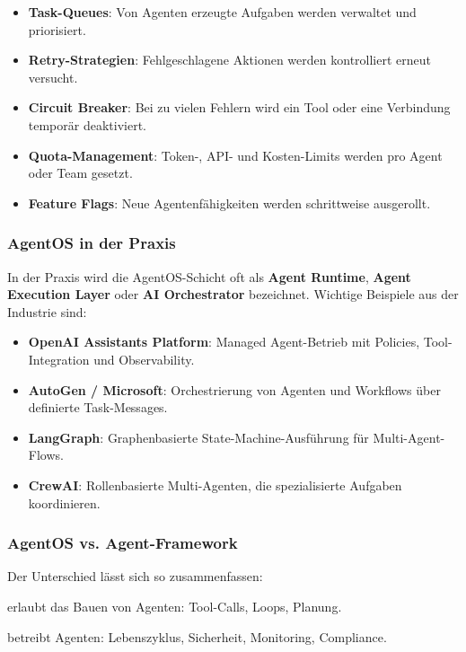 \begin{itemize}[leftmargin=*]
    \item \textbf{Task-Queues}: Von Agenten erzeugte Aufgaben werden verwaltet und priorisiert.
    \item \textbf{Retry-Strategien}: Fehlgeschlagene Aktionen werden kontrolliert erneut versucht.
    \item \textbf{Circuit Breaker}: Bei zu vielen Fehlern wird ein Tool oder eine Verbindung temporär deaktiviert.
    \item \textbf{Quota-Management}: Token-, API- und Kosten-Limits werden pro Agent oder Team gesetzt.
    \item \textbf{Feature Flags}: Neue Agentenfähigkeiten werden schrittweise ausgerollt.
\end{itemize}

\subsubsection{AgentOS in der Praxis}

In der Praxis wird die AgentOS-Schicht oft als \textbf{Agent Runtime}, \textbf{Agent Execution Layer} oder \textbf{AI Orchestrator} bezeichnet. Wichtige Beispiele aus der Industrie sind:

\begin{itemize}[leftmargin=*]
    \item \textbf{OpenAI Assistants Platform}: Managed Agent-Betrieb mit Policies, Tool-Integration und Observability.
    \item \textbf{AutoGen / Microsoft}: Orchestrierung von Agenten und Workflows über definierte Task-Messages.
    \item \textbf{LangGraph}: Graphenbasierte State-Machine-Ausführung für Multi-Agent-Flows.
    \item \textbf{CrewAI}: Rollenbasierte Multi-Agenten, die spezialisierte Aufgaben koordinieren.
\end{itemize}

\subsubsection{AgentOS vs. Agent-Framework}

Der Unterschied lässt sich so zusammenfassen:

\begin{description}[leftmargin=*,style=nextline]
    \item[Agent-Framework] erlaubt das Bauen von Agenten: Tool-Calls, Loops, Planung.
    \item[AgentOS] betreibt Agenten: Lebenszyklus, Sicherheit, Monitoring, Compliance.
\end{description}

